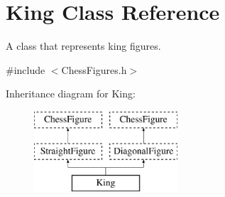 \hypertarget{classKing}{}\section{King Class Reference}
\label{classKing}


A class that represents king figures.  




{\ttfamily \#include $<$Chess\+Figures.\+h$>$}

Inheritance diagram for King\+:\begin{figure}[H]
\begin{center}
\leavevmode
\includegraphics[height=3.000000cm]{classKing}
\end{center}
\end{figure}
